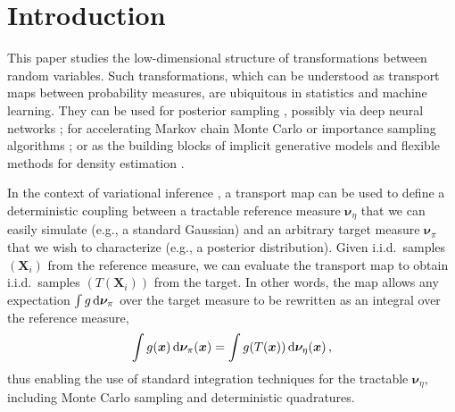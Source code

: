\documentclass[twoside,11pt]{article}
\newcommand{\genm}{\boldsymbol{\nu} }   %
\newcommand{\Xb}{\boldsymbol{X}}
\newcommand{\xb}{\boldsymbol{x}}
\begin{document}
%
\section{Introduction}
\label{sec:intro}
%
%
This paper studies the low-dimensional structure of transformations
between random variables. Such transformations, which can be
understood as transport maps between probability measures,
%
are ubiquitous in statistics and machine learning. %
They can be used for posterior sampling \citep{el2012bayesian}, possibly via deep neural networks \citep{rezende2015variational}; for accelerating Markov chain Monte Carlo or importance sampling algorithms 
\citep{parno2014transport,han2017stein};
%
or as the building blocks of implicit generative models \citep{kingma2013auto,goodfellow2014generative}
%
%
%
and flexible methods for density estimation \citep{tabak2013family,dinh2016density}.
%
%


In the context of variational inference \citep{blei2016variational}, a transport map can be used to
define a deterministic coupling between a tractable reference measure $\genm_\eta$ that we can easily simulate (e.g., a standard Gaussian) and an arbitrary target measure $\genm_\pi$ that we wish to
characterize (e.g., a posterior distribution).
%
%
Given i.i.d.\ samples $( \Xb_i )$ 
from the reference measure, 
we can evaluate the transport map to obtain i.i.d.\ samples 
$( T(\Xb_i) )$ from the target. 
%
%
In other words,
the map
%
allows any expectation
$\int g \, \rm{d}\genm_\pi$ over the target measure to be rewritten as
an integral over the reference measure,
%
\begin{equation*}
 \int g(\xb)\,{\rm d}\genm_\pi(\xb) = \int g(T(\xb))\,{\rm d}\genm_\eta(\xb) \,,
\end{equation*}
thus
enabling the use of 
standard integration techniques for the tractable $\genm_\eta$, including Monte Carlo
sampling \citep{meng2002warp} and deterministic quadratures. %
%
%
%
\end{document}
